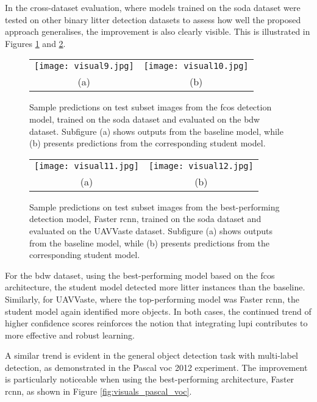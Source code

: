 In the cross-dataset evaluation, where models trained on the \gls{soda} dataset were tested on other binary litter detection datasets to assess how well the proposed approach generalises, the improvement is also clearly visible. This is illustrated in Figures \ref{fig:visuals_bdw} and \ref{fig:visuals_uavvaste}.

\begin{figure}[ht]
  \centering
  \begin{tabular}{cc}
    \texttt{[image: visual9.jpg]} &
    \texttt{[image: visual10.jpg]} \\
    \small (a) & \small (b) \\
  \end{tabular}
  \caption{Sample predictions on test subset images from the \gls{fcos} detection model, trained on the \gls{soda} dataset and evaluated on the \gls{bdw} dataset. Subfigure (a) shows outputs from the baseline model, while (b) presents predictions from the corresponding student model.}
  \label{fig:visuals_bdw}
\end{figure}

\begin{figure}[ht]
  \centering
  \begin{tabular}{cc}
    \texttt{[image: visual11.jpg]} &
    \texttt{[image: visual12.jpg]} \\
    \small (a) & \small (b) \\
  \end{tabular}
  \caption{Sample predictions on test subset images from the best-performing detection model, Faster \gls{rcnn}, trained on the \gls{soda} dataset and evaluated on the UAVVaste dataset. Subfigure (a) shows outputs from the baseline model, while (b) presents predictions from the corresponding student model.}
  \label{fig:visuals_uavvaste}
\end{figure}

For the \gls{bdw} dataset, using the best-performing model based on the \gls{fcos} architecture, the student model detected more litter instances than the baseline. Similarly, for UAVVaste, where the top-performing model was Faster \gls{rcnn}, the student model again identified more objects. In both cases, the continued trend of higher confidence scores reinforces the notion that integrating \gls{lupi} contributes to more effective and robust learning.

A similar trend is evident in the general object detection task with multi-label detection, as demonstrated in the Pascal \gls{voc} 2012 experiment. The improvement is particularly noticeable when using the best-performing architecture, Faster \gls{rcnn}, as shown in Figure \ref{fig:visuals_pascal_voc}.

